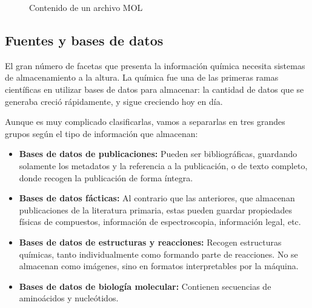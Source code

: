 \begin{figure}[H]
\centering
    \caption{Contenido de un archivo MOL \cite{molfile_example}} \label{fig:figura2}
\end{figure}


\subsection*{Fuentes y bases de datos}

El gran número de facetas que presenta la información química necesita sistemas de almacenamiento a la altura. La química fue una de las primeras ramas científicas en utilizar bases de datos para almacenar: la cantidad de datos que se generaba creció rápidamente, y sigue creciendo hoy en día. 

Aunque es muy complicado clasificarlas, vamos a separarlas en tres grandes grupos según el tipo de información que almacenan: \cite{doi:10.1021/ci600234z}
\begin{itemize}
    \item \textbf{Bases de datos de publicaciones:} Pueden ser bibliográficas, guardando solamente los metadatos y la referencia a la publicación, o de texto completo, donde recogen la publicación de forma íntegra. %
    \item \textbf{Bases de datos fácticas:} Al contrario que las anteriores, que almacenan publicaciones de la literatura primaria, estas pueden guardar propiedades físicas de compuestos, información de espectroscopia, información legal, etc.
    \item \textbf{Bases de datos de estructuras y reacciones:} Recogen estructuras químicas, tanto individualmente como formando parte de reacciones. No se almacenan como imágenes, sino en formatos interpretables por la máquina.
    \item \textbf{Bases de datos de biología molecular:} Contienen secuencias de aminoácidos y nucleótidos.
\end{itemize}

